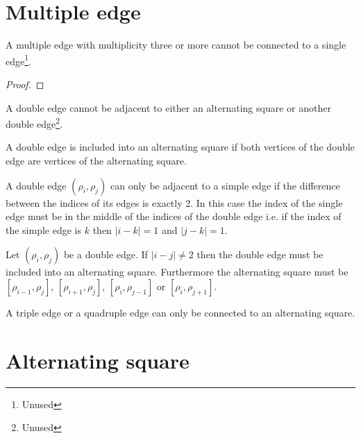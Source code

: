 \section{Multiple edge}

\begin{proposition}
  A multiple edge with multiplicity three or more cannot be connected to a single edge\footnote{Unused}.
\end{proposition}

\begin{proof}
\end{proof}

\begin{proposition}
  A double edge cannot be adjacent to either an alternating square or another double edge\footnote{Unused}.
\end{proposition}

\begin{definition}
  A double edge is included into an alternating square if both vertices of the double edge are vertices of the alternating square.
\end{definition}

\begin{proposition}
  \label{adjacent-double}
  A double edge $(\rho_i, \rho_j)$ can only be adjacent to a simple edge if the difference between the indices of its edges is exactly 2. In this case the index of the single edge must be in the middle of the indices of the double edge i.e. if the index of the simple edge is $k$ then $|i-k| = 1$ and $|j-k| = 1$.
\end{proposition}

\begin{corollary}
  \label{continue-double-edge}
  Let $(\rho_i, \rho_j)$ be a double edge. If $|i - j| \neq 2$ then the double edge must be included into an alternating square. Furthermore the alternating square must be  $[\rho_{i-1}, \rho_j]$, $[\rho_{i+1}, \rho_j]$, $[\rho_i, \rho_{j-1}]$ or $[\rho_i, \rho_{j+1}]$.
\end{corollary}

\begin{proposition}
  \label{continue-triple-edge}
  A triple edge or a quadruple edge can only be connected to an alternating square.
\end{proposition}

\section{Alternating square}

